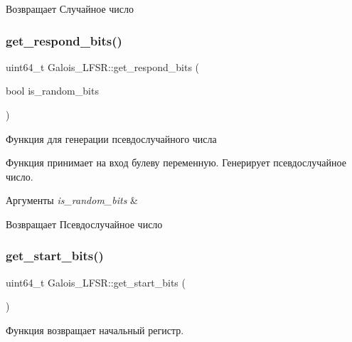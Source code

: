 \begin{DoxyReturn}{Возвращает}
Случайное число 
\end{DoxyReturn}
\mbox{\label{classGalois__LFSR_a1ceda4d66d840ff703cd14a3919b2f8b}} 
\subsubsection{\texorpdfstring{get\+\_\+respond\+\_\+bits()}{get\_respond\_bits()}}
{\footnotesize\ttfamily uint64\+\_\+t Galois\+\_\+\+L\+F\+S\+R\+::get\+\_\+respond\+\_\+bits (\begin{DoxyParamCaption}\item[{bool}]{is\+\_\+random\+\_\+bits }\end{DoxyParamCaption})}



Функция для генерации псевдослучайного числа 

Функция принимает на вход булеву переменную. Генерирует псевдослучайное число.


\begin{DoxyParams}{Аргументы}
{\em is\+\_\+random\+\_\+bits} & \\
\hline
\end{DoxyParams}
\begin{DoxyReturn}{Возвращает}
Псевдослучайное число 
\end{DoxyReturn}
\mbox{\label{classGalois__LFSR_aea6f1eea9ba930bb7419426a45a59c5c}} 
\subsubsection{\texorpdfstring{get\+\_\+start\+\_\+bits()}{get\_start\_bits()}}
{\footnotesize\ttfamily uint64\+\_\+t Galois\+\_\+\+L\+F\+S\+R\+::get\+\_\+start\+\_\+bits (\begin{DoxyParamCaption}{ }\end{DoxyParamCaption})}



Функция возвращает начальный регистр. 

